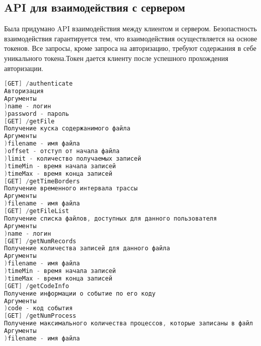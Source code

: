 \subsection{API для взаимодействия с сервером}
Была придумано API взаимодействия между клиентом и сервером. Безопастность взаимодействия гарантируется тем, что взаимодействия осуществляется на основе токенов. Все запросы, кроме запроса на авторизацию, требуют содержания в себе уникального токена.Токен дается клиенту после успешного прохождения авторизации.
\begin{lstlisting}[language=c++]
[GET] /authenticate
Авторизация
Аргументы
)name - логин
)password - пароль
[GET] /getFile
Получение куска содержанимого файла
Аргументы
)filename - имя файла
)offset - отступ от начала файла
)limit - количество получаемых записей
)timeMin - время начала записей
)timeMax - время конца записей
[GET] /getTimeBorders
Получение временного интервала трассы
Аргументы
)filename - имя файла
[GET] /getFileList
Получение списка файлов, доступных для данного пользователя
Аргументы
)name - логин
[GET] /getNumRecords
Получение количества записей для данного файла
Аргументы
)filename - имя файла
)timeMin - время начала записей
)timeMax - время конца записей 
[GET] /getCodeInfo
Получение информации о событие по его коду
Аргументы
)code - код события
[GET] /getNumProcess
Получение максимального количества процессов, которые записаны в файл
Аргументы
)filename - имя файла
\end{lstlisting}


